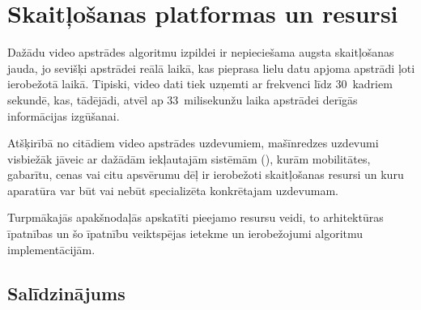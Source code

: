 \section{Skaitļošanas platformas un resursi} \label{sec:proc}
Dažādu video apstrādes algoritmu izpildei ir nepieciešama
augsta skaitļošanas jauda, jo sevišķi apstrādei reālā laikā, kas pieprasa
lielu datu apjoma apstrādi ļoti ierobežotā laikā. Tipiski, video dati
tiek uzņemti ar frekvenci līdz 30~kadriem sekundē, kas, tādējādi, atvēl ap
33~milisekunžu laika apstrādei derīgās informācijas izgūšanai.

Atšķirībā no citādiem video apstrādes uzdevumiem, mašīnredzes uzdevumi 
visbiežāk jāveic ar dažādām iekļautajām sistēmām (),
kurām mobilitātes, gabarītu, cenas vai citu apsvērumu dēļ ir ierobežoti
skaitļošanas resursi un kuru aparatūra var būt vai nebūt specializēta
konkrētajam uzdevumam.

Turpmākajās apakšnodaļās apskatīti pieejamo resursu veidi, to arhitektūras
īpatnības un šo īpatnību veiktspējas ietekme un ierobežojumi
algoritmu implementācijām.






\subsection{Salīdzinājums} \label{sec:proc-cmp}
\TODO
